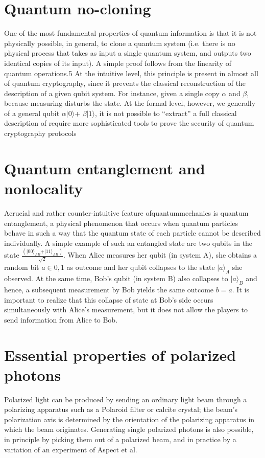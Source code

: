 \section{Quantum no-cloning}

One of the most fundamental properties of quantum information is that it is not physically possible, in general, to clone a quantum system  (i.e. there is no physical process that takes as input a single quantum system, and outputs two identical copies of its input). A simple proof follows from the linearity of quantum operations.5 At the intuitive level, this principle is present in almost all of quantum cryptography, since it prevents the classical reconstruction of the description of a given qubit system. For instance, given a single copy $\alpha$ and $\beta$, because measuring disturbs the state. At the formal level, however, we generally of a general qubit $\alpha\vert 0\rangle$+ $\beta\vert 1\rangle$, it is not possible to “extract” a full classical description of require more sophisticated tools to prove the security of quantum cryptography protocols

\section{Quantum entanglement and nonlocality}

Acrucial and rather counter-intuitive feature ofquantummechanics is quantum entanglement, a physical phenomenon that occurs when quantum particles behave in such a way that the quantum state of each particle cannot be described individually. A simple example of such an entangled state are two qubits in the state $\frac{(\vert 00\rangle_{AB} +\vert 11\rangle_{AB})}{\sqrt{2}}$. When Alice measures her
qubit (in system A), she obtains a random bit $a \in {0, 1}$ as outcome and her qubit collapses  to the state $\vert a\rangle_A$ she observed. At the same time, Bob’s qubit (in system B) also collapses to $\vert a\rangle_B$ and hence, a subsequent measurement by Bob yields the same outcome $b = a$. It is important to realize that this collapse of state at Bob’s side occurs simultaneously with Alice’s measurement, but it does not allow the players to send information from Alice to Bob.
\section{Essential properties of polarized photons}

Polarized light can be produced by sending an ordinary
light beam through a polarizing apparatus such as a Polaroid filter or calcite crystal; the beam’s polarization axis is determined by the orientation of the polarizing apparatus in which the beam originates. Generating single polarized photons is also possible, in principle by picking them out of a polarized beam, and in practice by a variation of an experiment of Aspect \textcite{Aspect1982} et al.

